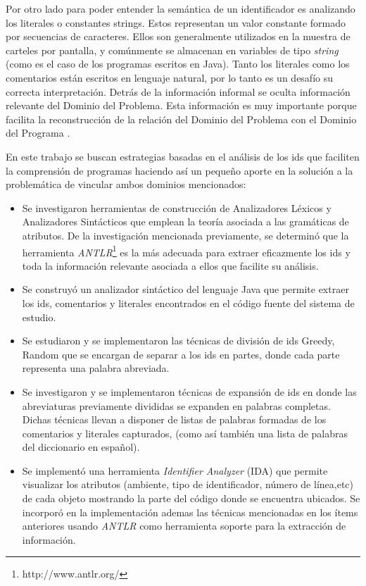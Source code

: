 \documentclass[12pt]{report}
\begin{document}
Por otro lado para poder entender la semántica de un identificador es analizando los literales o constantes strings.
Estos representan un valor constante formado por  secuencias de caracteres. 
Ellos son generalmente utilizados en la muestra de carteles por pantalla, y 
comúnmente se almacenan en variables de tipo \textit{string} (como es el caso de 
los programas escritos en Java).
Tanto los literales como los comentarios están escritos en lenguaje natural, por lo tanto es un desafío su correcta interpretación.
Detrás de la información informal se oculta información relevante del 
Dominio del Problema.
Esta información es muy importante porque facilita  la reconstrucción de la relación del  
Dominio del Problema con el Dominio del Programa 
\cite{DWE04}.

En este trabajo se buscan estrategias basadas en el análisis de los ids que faciliten la comprensión de programas haciendo así un pequeño aporte en la solución a la problemática de vincular ambos dominios mencionados: 

\begin{itemize}

\item Se investigaron herramientas de construcción de Analizadores Léxicos y Analizadores Sintácticos que emplean la teoría asociada a las gramáticas de atributos. 
De la investigación mencionada previamente,  
se determinó que la herramienta \textit{ANTLR}\footnote[1]{http://www.antlr.org/} es la más adecuada para extraer eficazmente los ids y toda la información relevante asociada a ellos que facilite su análisis.

\item Se construyó un analizador sintáctico del lenguaje Java que permite extraer los ids, comentarios y literales encontrados en el código fuente del sistema de estudio.

\item  Se estudiaron y se implementaron las técnicas de división de ids Greedy, Random \cite{HDD06,FBL06} que se encargan de separar a los ids en partes, donde cada parte representa una palabra abreviada.

\item Se investigaron y se implementaron técnicas de expansión de ids en donde las abreviaturas previamente divididas se expanden en palabras completas.  
Dichas técnicas llevan a disponer de listas de palabras formadas de los comentarios y literales capturados, (como así también una lista de palabras del diccionario en español).

\item Se implementó una herramienta \textit{Identifier Analyzer} (IDA) que permite visualizar los atributos (ambiente, tipo de identificador, número de línea,etc) de cada objeto mostrando la parte del código donde se encuentra ubicados. Se incorporó en la implementación ademas las técnicas mencionadas en los ítems anteriores usando \textit{ANTLR} como herramienta soporte para la extracción de información.

\end{itemize}
\end{document}
